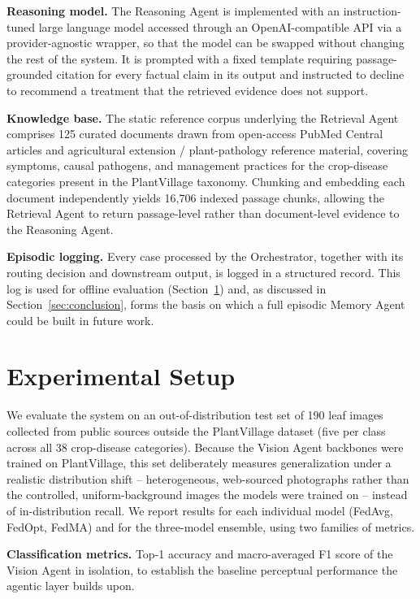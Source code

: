 \documentclass[conference]{IEEEtran}
\begin{document}
\textbf{Reasoning model.} The Reasoning Agent is implemented with an instruction-tuned large language model accessed through an OpenAI-compatible API via a provider-agnostic wrapper, so that the model can be swapped without changing the rest of the system. It is prompted with a fixed template requiring passage-grounded citation for every factual claim in its output and instructed to decline to recommend a treatment that the retrieved evidence does not support.

\textbf{Knowledge base.} The static reference corpus underlying the Retrieval Agent comprises 125 curated documents drawn from open-access PubMed Central articles and agricultural extension / plant-pathology reference material, covering symptoms, causal pathogens, and management practices for the crop-disease categories present in the PlantVillage taxonomy. Chunking and embedding each document independently yields 16{,}706 indexed passage chunks, allowing the Retrieval Agent to return passage-level rather than document-level evidence to the Reasoning Agent.

\textbf{Episodic logging.} Every case processed by the Orchestrator, together with its routing decision and downstream output, is logged in a structured record. This log is used for offline evaluation (Section~\ref{sec:exp}) and, as discussed in Section~\ref{sec:conclusion}, forms the basis on which a full episodic Memory Agent could be built in future work.

\section{Experimental Setup}
\label{sec:exp}

We evaluate the system on an out-of-distribution test set of 190 leaf images collected from public sources outside the PlantVillage dataset (five per class across all 38 crop-disease categories). Because the Vision Agent backbones were trained on PlantVillage, this set deliberately measures generalization under a realistic distribution shift -- heterogeneous, web-sourced photographs rather than the controlled, uniform-background images the models were trained on -- instead of in-distribution recall. We report results for each individual model (FedAvg, FedOpt, FedMA) and for the three-model ensemble, using two families of metrics.

\textbf{Classification metrics.} Top-1 accuracy and macro-averaged F1 score of the Vision Agent in isolation, to establish the baseline perceptual performance the agentic layer builds upon.
\end{document}
